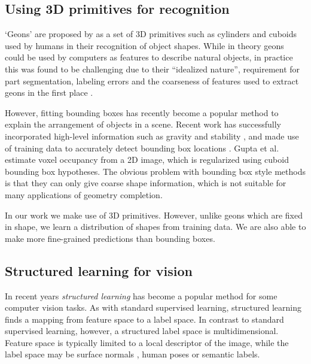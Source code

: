 \documentclass[10pt,twocolumn,letterpaper]{article}
\makeatletter
\newcommand*{\ea}{et al.\@\xspace}
\makeatother
\begin{document}
\subsection{Using 3D primitives for recognition}

`Geons' are proposed by \cite{bieberman-rbc-1987} as a set of 3D primitives such as cylinders and cuboids used by humans in their recognition of object shapes.
While in theory geons could be used by computers  as features to describe natural objects, in practice this was found to be challenging due to their ``idealized nature'', requirement for part segmentation, labeling errors and the coarseness of features used to extract geons in the first place \cite{dickinson-iavc-1997}.

However, fitting bounding boxes has recently become a popular method to explain the arrangement of objects in a scene.
Recent work has successfully incorporated high-level information such as gravity and stability
 \cite{shao-siggraphasia-2014, jia-cvpr-2013}, and made use of training data to accurately detect bounding box locations \cite{hedau-cvpr-2012}.
Gupta \ea \cite{gupta-cvpr-2011} estimate voxel occupancy from a 2D image, which is regularized using cuboid bounding box hypotheses.
The obvious problem with bounding box style methods is that they can only give coarse shape information, which is not suitable for many applications of geometry completion.

In our work we make use of 3D primitives.
However, unlike geons which are fixed in shape, we learn a distribution of shapes from training data.
We are also able to make more fine-grained predictions than bounding boxes.

\subsection{Structured learning for vision}
In recent years \emph{structured learning} has become a popular method for some computer vision tasks.
As with standard supervised learning, structured learning finds a mapping from feature space to a label space.
In contrast to standard supervised learning, however, a structured label space is multidimensional.
Feature space is typically limited to a local descriptor of the image, while the label space may be surface normals \cite{fouhey-iccv-2013}, human poses \cite{bourdev-iccv-2009} or semantic labels.
\end{document}
